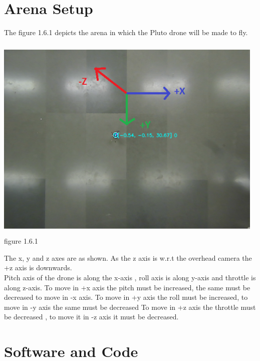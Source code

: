 \documentclass[a4paper,12pt,oneside]{book}
\begin{document}
\section{ Arena Setup}
The figure 1.6.1 depicts the arena in which the Pluto drone will be made to fly.\\
\vspace{1em}
\begin{center}
    \includegraphics[width = 13cm , height= 10cm]{deck1.png}
    figure 1.6.1
\end{center}

\vspace{1em}

The x, y and z axes are as shown. As the z axis is w.r.t the overhead camera the +z axis is downwards.\\
Pitch axis of the drone is along the x-axis , roll axis is along y-axis and throttle is along z-axis.
To move in +x axis the pitch must be increased, the same must be decreased to move in -x axis.
To move in +y axis the roll must be increased, to move in -y axis  the same must be decreased
To move in +z axis the throttle must be decreased , to move it in -z axis it must be decreased.



\section{Software and Code}
\end{document}
